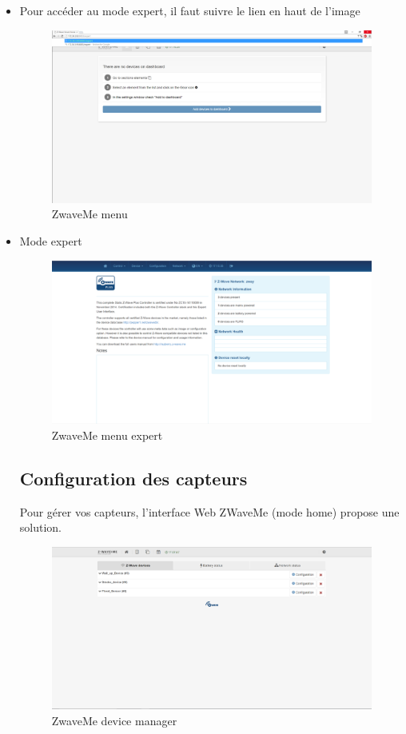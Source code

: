 \begin{itemize}
\item  Pour accéder au mode expert, il faut suivre le lien en haut de l'image

\begin{figure}[h]
	\center
	\includegraphics[scale=0.5]{./Images/png/go_to_zwaveme.png}
	\caption{ZwaveMe menu}
\end{figure}

\item Mode expert

\begin{figure}[h]
	\center
	\includegraphics[scale=0.5]{./Images/png/expert_zwaveme.png}
	\caption{ZwaveMe menu expert}
\end{figure}

\subsection{Configuration des capteurs}
Pour gérer vos capteurs, l'interface Web ZWaveMe (mode home) propose une solution.

\begin{figure}[h]
	\center
\includegraphics[scale=0.5]{./Images/png/manage_zwaveme.png}
	\caption{ZwaveMe device manager}
\end{figure}


\end{itemize}
